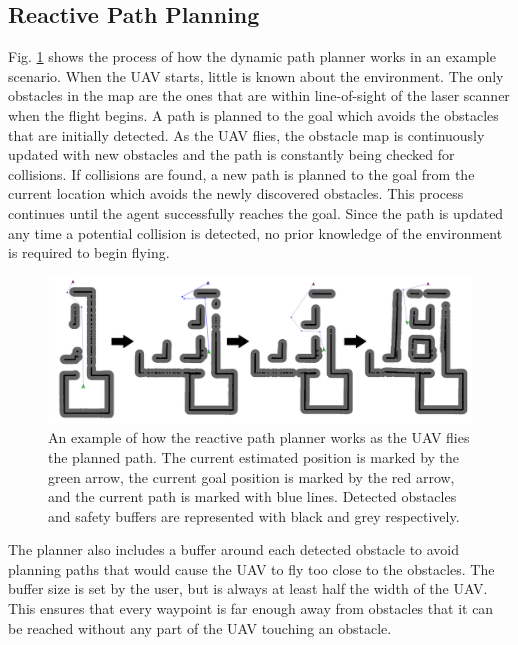 \documentclass[letterpaper, 10 pt, conference]{ieeeconf}  %
\begin{document}
\subsection{Reactive Path Planning}

Fig. \ref{fig:reactive_plan} shows the process of how the dynamic path planner works in an example scenario. When the UAV starts, little is known about the environment. The only obstacles in the map are the ones that are within line-of-sight of the laser scanner when the flight begins. A path is planned to the goal which avoids the obstacles that are initially detected. As the UAV flies, the obstacle map is continuously updated with new obstacles and the path is constantly being checked for collisions. If collisions are found, a new path is planned to the goal from the current location which avoids the newly discovered obstacles. This process continues until the agent successfully reaches the goal. Since the path is updated any time a potential collision is detected, no prior knowledge of the environment is required to begin flying.

\begin{figure}
\centering
\includegraphics[width=1.0\linewidth]{adaptive_path_plan2.png}
\caption{An example of how the reactive path planner works as the UAV flies the planned path. The current estimated position is marked by the green arrow, the current goal position is marked by the red arrow, and the current path is marked with blue lines. Detected obstacles and safety buffers are represented with black and grey respectively.}
\label{fig:reactive_plan}
\end{figure}

The planner also includes a buffer around each detected obstacle to avoid planning paths that would cause the UAV to fly too close to the obstacles. The buffer size is set by the user, but is always at least half the width of the UAV. This ensures that every waypoint is far enough away from obstacles that it can be reached without any part of the UAV touching an obstacle.
\end{document}
